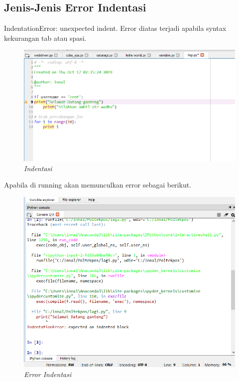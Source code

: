 \subsection{Jenis-Jenis Error Indentasi}
IndentationError: unexpected indent. Error diatas terjadi apabila syntax kekurangan tab atau spasi.
\begin{figure}[H]
    \centering
    \includegraphics[scale=0.2]{figures/indentasi}
    \caption{\textit{Indentasi}}
    \label{Indentasi}
\end{figure}
Apabila di running akan memunculkan error sebagai berikut.
\begin{figure}[H]
    \centering
    \includegraphics[scale=0.4]{figures/errorindentasi}
    \caption{\textit{Error Indentasi}}
    \label{Error Indentasi}
\end{figure}

